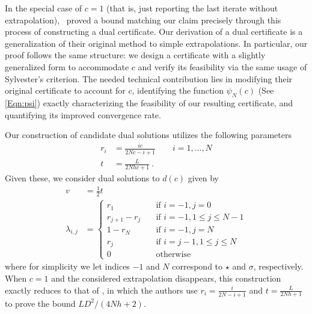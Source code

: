 \documentclass[11pt]{article}
\numberwithin{equation}{section}
\theoremstyle{definition}
\theoremstyle{definition}
\theoremstyle{definition}
\newcommand{\1}{\mathbf{1}}
\newcommand{\idxSpecial}{\sigma}
\begin{document}
In the special case of $c=1$ (that is, just reporting the last iterate without extrapolation),~\cite{FirstPEP} proved a bound matching our claim precisely through this process of constructing a dual certificate. Our derivation of a dual certificate is a generalization of their original method to simple extrapolations. In particular, our proof follows the same structure: we design a certificate with a slightly generalized form to accommodate $c$ and verify its feasibility via the same usage of Sylvester's criterion. The needed technical contribution lies in modifying their original certificate to account for $c$, identifying the function $\psi_N(c)$ (See \eqref{Eqn:psi}) exactly characterizing the feasibility of our resulting certificate, and quantifying its improved convergence rate.

Our construction of candidate dual solutions utilizes the following parameters
\begin{align}\label{Eqn:certComponents} %
        r_i &= \frac{ic}{2Nc-i+1} \quad \quad i=1,\dots,N\\
        t & = \frac{L}{2Nhc+1} \nonumber \ .
\end{align}
Given these, we consider dual solutions to $d(c)$ given by
\begin{align} \label{Eqn:dualVarVals}
    v &= \frac{1}{2}t \\
    \lambda_{i,j} &= \begin{cases}
        r_1 \quad & \text{if } i=-1,j=0 \\
        r_{j+1}-r_j \quad & \text{if } i=-1, 1\leq j \leq N-1 \\
        1-r_N \quad & \text{if } i=-1,j=N \\
        r_j \quad & \text{if } i=j-1, 1\leq j \leq N \\
        0 \quad & \text{otherwise}
    \end{cases}
\end{align}
where for simplicity we let indices $-1$ and $N$ correspond to $\star$ and $\idxSpecial$, respectively. When $c=1$ and the considered extrapolation disappears, this construction exactly reduces to that of \cite{FirstPEP}, in which the authors use $r_i = \frac{i}{2N-i+1}$ and $t = \frac{L}{2Nh+1}$ to prove the bound $LD^2/(4Nh+2)$.
\end{document}
